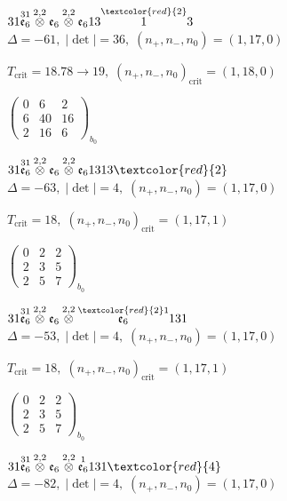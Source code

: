 \documentclass[10pt]{article}
\begin{document}
$31\overset{31}{\mathfrak{e}_6}\overset{2,2}{\otimes}\mathfrak{e}_6\overset{2,2}{\otimes}\mathfrak{e}_613\overset{\textcolor{red}{2}}{1}3$ \quad $\Delta=-61,\; |\det|=36,\; (n_+,n_-,n_0)=(1,17,0)$

\hspace{1em}$T_{\text{crit}}=18.78 \to 19,\; (n_+,n_-,n_0)_{\text{crit}}=(1,18,0)$

\hspace{2em}$\left(\begin{smallmatrix}0 & 6 & 2 \\ 6 & 40 & 16 \\ 2 & 16 & 6\end{smallmatrix}\right)_{\!b_0}$

$31\overset{31}{\mathfrak{e}_6}\overset{2,2}{\otimes}\mathfrak{e}_6\overset{2,2}{\otimes}\mathfrak{e}_61313\textcolor{red}{2}$ \quad $\Delta=-63,\; |\det|=4,\; (n_+,n_-,n_0)=(1,17,0)$

\hspace{1em}$T_{\text{crit}}=18,\; (n_+,n_-,n_0)_{\text{crit}}=(1,17,1)$

\hspace{2em}$\left(\begin{smallmatrix}0 & 2 & 2 \\ 2 & 3 & 5 \\ 2 & 5 & 7\end{smallmatrix}\right)_{\!b_0}$

\smallskip

$31\overset{31}{\mathfrak{e}_6}\overset{2,2}{\otimes}\mathfrak{e}_6\overset{2,2}{\otimes}\overset{\textcolor{red}{2}1}{\mathfrak{e}_6}131$ \quad $\Delta=-53,\; |\det|=4,\; (n_+,n_-,n_0)=(1,17,0)$

\hspace{1em}$T_{\text{crit}}=18,\; (n_+,n_-,n_0)_{\text{crit}}=(1,17,1)$

\hspace{2em}$\left(\begin{smallmatrix}0 & 2 & 2 \\ 2 & 3 & 5 \\ 2 & 5 & 7\end{smallmatrix}\right)_{\!b_0}$

$31\overset{31}{\mathfrak{e}_6}\overset{2,2}{\otimes}\mathfrak{e}_6\overset{2,2}{\otimes}\overset{1}{\mathfrak{e}_6}131\textcolor{red}{4}$ \quad $\Delta=-82,\; |\det|=4,\; (n_+,n_-,n_0)=(1,17,0)$
\end{document}
